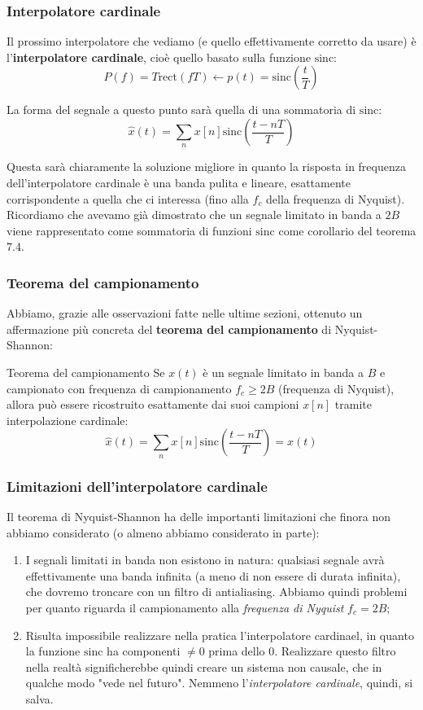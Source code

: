 \documentclass[a4paper,11pt]{article}
\begin{document}
\subsubsection{Interpolatore cardinale}
Il prossimo interpolatore che vediamo (e quello effettivamente corretto da usare) è l'\textbf{interpolatore cardinale}, cioè quello basato sulla funzione $\mathrm{sinc}$:
$$
P(f) = T \mathrm{rect}(fT) \leftarrow p(t) = \mathrm{sinc}\left( \frac{t}{T} \right)
$$

La forma del segnale a questo punto sarà quella di una sommatoria di $\mathrm{sinc}$:
$$
\hat{x} (t) = \sum_n x[n] \mathrm{sinc} \left( \frac{t - nT}{T} \right) 
$$

Questa sarà chiaramente la soluzione migliore in quanto la risposta in frequenza dell'interpolatore cardinale è una banda pulita e lineare, esattamente corrispondente a quella che ci interessa (fino alla $f_c$ della frequenza di Nyquist). Ricordiamo che avevamo già dimostrato che un segnale limitato in banda a $2B$ viene rappresentato come sommatoria di funzioni $\mathrm{sinc}$ come corollario del teorema 7.4.

\subsubsection{Teorema del campionamento}
Abbiamo, grazie alle osservazioni fatte nelle ultime sezioni, ottenuto un affermazione più concreta del \textbf{teorema del campionamento} di Nyquist-Shannon:

\begin{theorem}{Teorema del campionamento}
Se $x(t)$ è un segnale limitato in banda a $B$ e campionato con frequenza di campionamento $f_c \geq 2B$ (frequenza di Nyquist), allora può essere ricostruito esattamente dai suoi campioni $x[n]$ tramite interpolazione cardinale:
$$
\hat{x} (t) = \sum_n x[n] \mathrm{sinc} \left( \frac{t - nT}{T} \right) = x(t)
$$
\end{theorem}

\subsubsection{Limitazioni dell'interpolatore cardinale}
Il teorema di Nyquist-Shannon ha delle importanti limitazioni che finora non abbiamo considerato (o almeno abbiamo considerato in parte):
\begin{enumerate}
	\item I segnali limitati in banda non esistono in natura: qualsiasi segnale avrà effettivamente una banda infinita (a meno di non essere di durata infinita), che dovremo troncare con un filtro di antialiasing. Abbiamo quindi problemi per quanto riguarda il campionamento alla \textit{frequenza di Nyquist} $f_c = 2B$; 
	\item Risulta impossibile realizzare nella pratica l'interpolatore cardinael, in quanto la funzione $\mathrm{sinc}$ ha componenti $\neq 0$ prima dello 0. Realizzare questo filtro nella realtà significherebbe quindi creare un sistema non causale, che in qualche modo "vede nel futuro". Nemmeno l'\textit{interpolatore cardinale}, quindi, si salva.
\end{enumerate}
\end{document}
